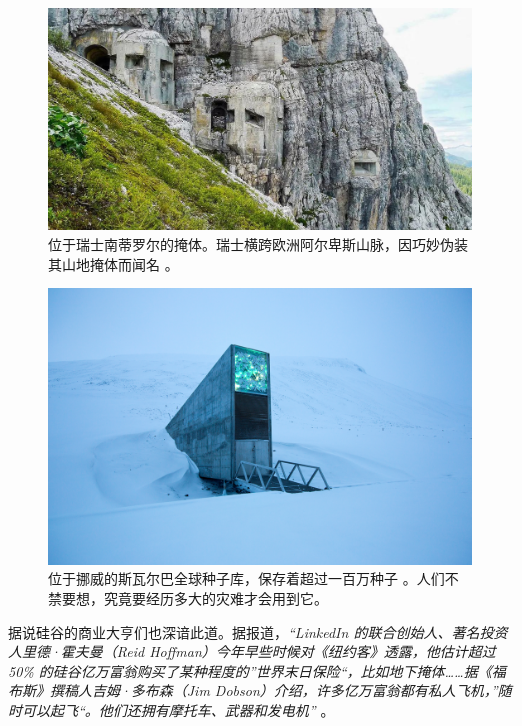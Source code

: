 \documentclass[10pt,twocolumn,letterpaper]{article}
\begin{document}
\begin{figure}[t]
\begin{center}
   \includegraphics[width=1\linewidth]{tyrol.jpg}
\end{center}
\caption{位于瑞士南蒂罗尔的掩体。瑞士横跨欧洲阿尔卑斯山脉，因巧妙伪装其山地掩体而闻名 \cite{32}。}
\label{fig:7}
\label{fig:onecol}
\end{figure}

\begin{figure}[t]
\begin{center}
   \includegraphics[width=1\linewidth]{svalbard.jpg}
\end{center}
   \caption{位于挪威的斯瓦尔巴全球种子库，保存着超过一百万种子 \cite{24}。人们不禁要想，究竟要经历多大的灾难才会用到它。}
\label{fig:8}
\label{fig:onecol}
\end{figure}

据说硅谷的商业大亨们也深谙此道。据报道，\textit{“LinkedIn 的联合创始人、著名投资人里德·霍夫曼（Reid Hoffman）今年早些时候对《纽约客》透露，他估计超过 50\% 的硅谷亿万富翁购买了某种程度的”世界末日保险“，比如地下掩体……据《福布斯》撰稿人吉姆·多布森（Jim Dobson）介绍，许多亿万富翁都有私人飞机，”随时可以起飞“。他们还拥有摩托车、武器和发电机”} \cite{28}。
\end{document}
